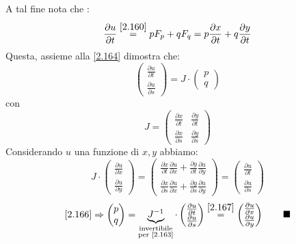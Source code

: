 \documentclass[a4paper,11pt]{report}
\begin{document}
A tal fine nota che :
\[
\frac{\partial u}{\partial t}\overset{\eqref{2.160}}{=} p F_p + q F_q = p\frac{\partial x}{\partial t} + q \frac{\partial y}{\partial t}
\]
Questa, assieme alla \eqref{2.164} dimostra che: 
\begin{equation}
\left(\begin{matrix}
\frac{\partial u}{\partial t}\\
\frac{\partial u}{\partial s}
\end{matrix}\right) = J \cdot \left(\begin{matrix}
p\\
q
\end{matrix}\right)
\label{2.166}
\end{equation}
con
\[
J=\left(\begin{matrix}
\frac{\partial x}{\partial t} & \frac{\partial y}{\partial t} \\
\frac{\partial x}{\partial s} & \frac{\partial y}{\partial s}
\end{matrix}\right)
\]
Considerando $u$ una funzione di $x,y$ abbiamo: 
\begin{equation}
J \cdot \left(\begin{matrix}
\frac{\partial u}{\partial x} \\
\frac{\partial u}{\partial y}
\end{matrix}\right)=
\left(\begin{matrix}
\frac{\partial x}{\partial t}\frac{\partial u}{\partial x} + \frac{\partial y}{\partial t}\frac{\partial u}{\partial y} \\
\frac{\partial x}{\partial s}\frac{\partial u}{\partial x} + \frac{\partial y}{\partial s}\frac{\partial u}{\partial y}
\end{matrix}\right)=
\left(\begin{matrix}
\frac{\partial u}{\partial t} \\
\frac{\partial u}{\partial s}
\end{matrix}\right)
\label{2.167}
\end{equation}
\[
\eqref{2.166}\Rightarrow \left(\begin{matrix}
p\\
q
\end{matrix}\right) = \underbrace{J^{-1}}_{\substack{\text{invertibile}\\ \text{per \eqref{2.163}} }} \cdot \left(\begin{matrix}
\frac{\partial u}{\partial t}\\
\frac{\partial u}{\partial s}
\end{matrix}\right)\overset{\eqref{2.167}}{=}\left(\begin{matrix}
\frac{\partial u}{\partial x} \\
\frac{\partial u}{\partial y}
\end{matrix}\right) \qquad \blacksquare
\]
\end{document}
